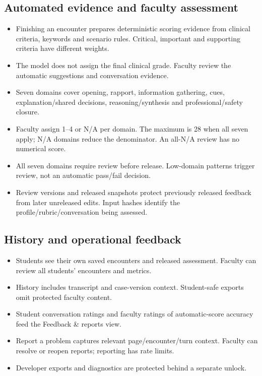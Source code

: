 \documentclass[10pt,letterpaper]{article}
\begin{document}
\subsection*{Automated evidence and faculty assessment}
\begin{itemize}
\item Finishing an encounter prepares deterministic scoring evidence from clinical criteria, keywords and scenario rules. Critical, important and supporting criteria have different weights.
\item The model does not assign the final clinical grade. Faculty review the automatic suggestions and conversation evidence.
\item Seven domains cover opening, rapport, information gathering, cues, explanation/shared decisions, reasoning/synthesis and professional/safety closure.
\item Faculty assign 1--4 or N/A per domain. The maximum is 28 when all seven apply; N/A domains reduce the denominator. An all-N/A review has no numerical score.
\item All seven domains require review before release. Low-domain patterns trigger review, not an automatic pass/fail decision.
\item Review versions and released snapshots protect previously released feedback from later unreleased edits. Input hashes identify the profile/rubric/conversation being assessed.
\end{itemize}
\subsection*{History and operational feedback}
\begin{itemize}
\item Students see their own saved encounters and released assessment. Faculty can review all students' encounters and metrics.
\item History includes transcript and case-version context. Student-safe exports omit protected faculty content.
\item Student conversation ratings and faculty ratings of automatic-score accuracy feed the Feedback \& reports view.
\item Report a problem captures relevant page/encounter/turn context. Faculty can resolve or reopen reports; reporting has rate limits.
\item Developer exports and diagnostics are protected behind a separate unlock.
\end{itemize}
\end{document}
